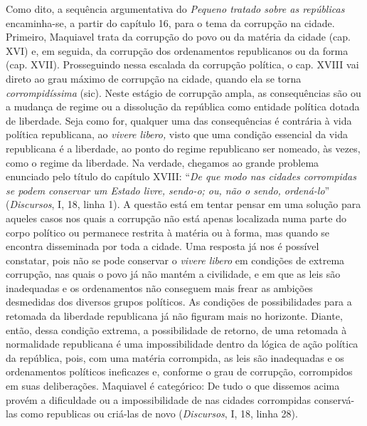 Como dito, a sequência argumentativa do \emph{Pequeno tratado sobre as
repúblicas} encaminha-se, a partir do capítulo 16, para o tema da
corrupção na cidade. Primeiro, Maquiavel trata da corrupção do povo ou
da matéria da cidade (cap. XVI) e, em seguida, da corrupção dos
ordenamentos republicanos ou da forma (cap. XVII). Prosseguindo nessa
escalada da corrupção política, o cap. XVIII vai direto ao grau máximo
de corrupção na cidade, quando ela se torna \emph{corrompidíssima}
(sic). Neste estágio de corrupção ampla, as consequências são ou a
mudança de regime ou a dissolução da república como entidade política
dotada de liberdade. Seja como for, qualquer uma das consequências é
contrária à vida política republicana, ao \emph{vivere libero,} visto
que uma condição essencial da vida republicana é a liberdade, ao ponto
do regime republicano ser nomeado, às vezes, como o regime da liberdade.
Na verdade, chegamos ao grande problema enunciado pelo título do
capítulo XVIII: ``\emph{De que modo nas cidades corrompidas se podem
conservar um Estado livre, sendo-o; ou, não o sendo, ordená-lo}''
(\emph{Discursos}, I, 18, linha 1). A questão está em tentar pensar em
uma solução para aqueles casos nos quais a corrupção não está apenas
localizada numa parte do corpo político ou permanece restrita à matéria
ou à forma, mas quando se encontra disseminada por toda a cidade. Uma
resposta já nos é possível constatar, pois não se pode conservar o
\emph{vivere libero} em condições de extrema corrupção, nas quais o povo
já não mantém a civilidade, e em que as leis são inadequadas e os
ordenamentos não conseguem mais frear as ambições desmedidas dos
diversos grupos políticos. As condições de possibilidades para a
retomada da liberdade republicana já não figuram mais no horizonte.
Diante, então, dessa condição extrema, a possibilidade de retorno, de
uma retomada à normalidade republicana é uma impossibilidade dentro da
lógica de ação política da república, pois, com uma matéria corrompida,
as leis são inadequadas e os ordenamentos políticos ineficazes e,
conforme o grau de corrupção, corrompidos em suas deliberações.
Maquiavel é categórico: De tudo o que dissemos acima provém a
dificuldade ou a impossibilidade de nas cidades corrompidas conservá-las
como republicas ou criá-las de novo (\emph{Discursos}, I, 18, linha 28).

